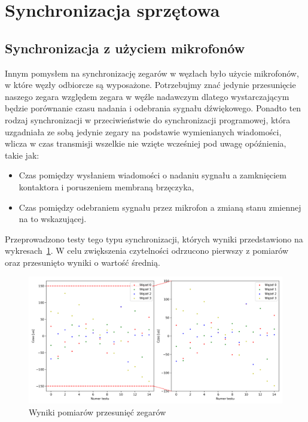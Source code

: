 \section{Synchronizacja sprzętowa}



\subsection{Synchronizacja z użyciem mikrofonów}\label{sec:mic_sync}

Innym pomysłem na synchronizację zegarów w węzłach było użycie mikrofonów, w które węzły odbiorcze są wyposażone. Potrzebujmy znać jedynie przesunięcie naszego zegara względem zegara w węźle nadawczym dlatego wystarczającym będzie porównanie czasu nadania i odebrania sygnału dźwiękowego. Ponadto ten rodzaj synchronizacji w przeciwieństwie do synchronizacji programowej, która uzgadniała ze sobą jedynie zegary na podstawie wymienianych wiadomości, wlicza w czas transmisji wszelkie nie wzięte wcześniej pod uwagę opóźnienia, takie jak:

\begin{itemize}
    \item Czas pomiędzy wysłaniem wiadomości o nadaniu sygnału a zamknięciem kontaktora i poruszeniem membraną brzęczyka,
    \item Czas pomiędzy odebraniem sygnału przez mikrofon a zmianą stanu zmiennej na to wskazującej.
\end{itemize}

Przeprowadzono testy tego typu synchronizacji, których wyniki przedstawiono na wykresach~\ref{pic:mic_sync}. W celu zwiększenia czytelności odrzucono pierwszy z pomiarów oraz przesunięto wyniki o wartość średnią.

\begin{figure}[H]
\centering
    \includegraphics[width=\textwidth]{pics/mic_sync/offsets.png}
\caption{Wyniki pomiarów przesunięć zegarów}
\label{pic:mic_sync}
\end{figure}

